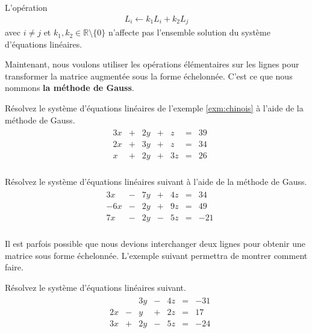 \documentclass[]{book}
\theoremstyle{definition}
\theoremstyle{definition}
\theoremstyle{definition}
\theoremstyle{remark}
\let\BeginKnitrBlock\begin \let\EndKnitrBlock\end
\begin{document}
\BeginKnitrBlock{proposition}
\protect\hypertarget{prp:unnamed-chunk-22}{}{\label{prp:unnamed-chunk-22} }L'opération
\begin{align*}
L_i\leftarrow k_1L_i+k_2L_j
\end{align*}
avec \(i\neq j\) et \(k_1,k_2\in\mathbb{R}\setminus \{0\}\) n'affecte pas l'ensemble solution du système d'équations linéaires.
\EndKnitrBlock{proposition}

Maintenant, nous voulons utiliser les opérations élémentaires sur les lignes pour transformer la matrice augmentée sous la forme échelonnée. C'est ce que nous nommons \textbf{la méthode de Gauss}.

\BeginKnitrBlock{example}
\protect\hypertarget{exm:unnamed-chunk-23}{}{\label{exm:unnamed-chunk-23} }Résolvez le système d'équations linéaires de l'exemple \ref{exm:chinois} à l'aide de la méthode de Gauss.
\begin{align*}
\begin{array}{cccccccc}
&3x&+&2y&+&z&=&39\\
&2x&+&3y&+&z&=&34\\
&x&+&2y&+&3z&=&26\\
\end{array}
\end{align*}
\EndKnitrBlock{example}

\BeginKnitrBlock{example}
\protect\hypertarget{exm:unnamed-chunk-24}{}{\label{exm:unnamed-chunk-24} }Résolvez le système d'équations linéaires suivant à l'aide de la méthode de Gauss.
\begin{align*}
\begin{array}{cccccccc}
&3x&-&7y&+&4z&=&34\\
&-6x&-&2y&+&9z&=&49\\
&7x&-&2y&-&5z&=&-21\\
\end{array}
\end{align*}
\EndKnitrBlock{example}

Il est parfois possible que nous devions interchanger deux lignes pour obtenir une matrice sous forme échelonnée. L'exemple suivant permettra de montrer comment faire.

\BeginKnitrBlock{example}
\protect\hypertarget{exm:unnamed-chunk-25}{}{\label{exm:unnamed-chunk-25} }Résolvez le système d'équations linéaires suivant.
\begin{align*}
\begin{array}{cccccccc}
&&&3y&-&4z&=&-31\\
&2x&-&y&+&2z&=&17\\
&3x&+&2y&-&5z&=&-24\\
\end{array}
\end{align*}
\EndKnitrBlock{example}
\end{document}
